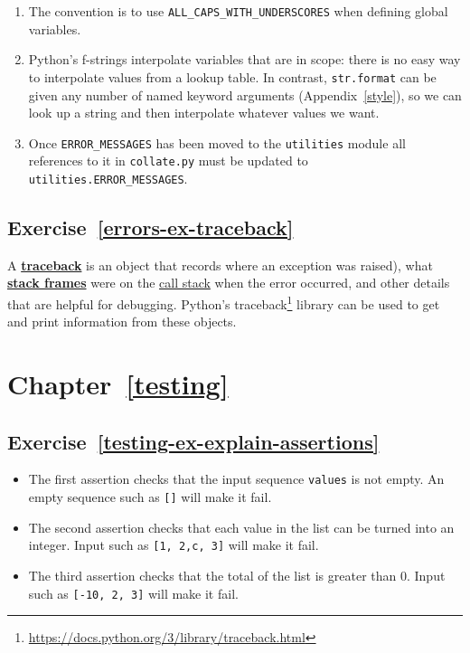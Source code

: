 \documentclass[
]{krantz}
\renewcommand{\href}[2]{#2\footnote{\url{#1}}}
\newcommand{\gref}[2]{\hyperlink{#2}{\textbf{#1}}}
\begin{document}
\begin{enumerate}
\def\labelenumi{\arabic{enumi}.}
\item
  The convention is to use \texttt{ALL\_CAPS\_WITH\_UNDERSCORES} when defining global variables.
\item
  Python's f-strings interpolate variables that are in scope:
  there is no easy way to interpolate values from a lookup table.
  In contrast,
  \texttt{str.format} can be given any number of named keyword arguments (Appendix~\ref{style}),
  so we can look up a string and then interpolate whatever values we want.
\item
  Once \texttt{ERROR\_MESSAGES} has been moved to the \texttt{utilities} module
  all references to it in \texttt{collate.py} must be updated to \texttt{utilities.ERROR\_MESSAGES}.
\end{enumerate}

\hypertarget{exercise-referrors-ex-traceback}{%
\subsection*{Exercise~\ref{errors-ex-traceback}}\label{exercise-referrors-ex-traceback}}


A \gref{traceback}{traceback} is an object that records where an exception was
raised), what \gref{stack frames}{stack\_frame} were on the
\protect\hyperlink{call_stack}{call stack} when the error occurred, and other details that are
helpful for debugging. Python's \href{https://docs.python.org/3/library/traceback.html}{traceback} library can be
used to get and print information from these objects.

\hypertarget{chapter-reftesting}{%
\section*{Chapter~\ref{testing}}\label{chapter-reftesting}}

\hypertarget{exercise-reftesting-ex-explain-assertions}{%
\subsection*{Exercise~\ref{testing-ex-explain-assertions}}\label{exercise-reftesting-ex-explain-assertions}}


\begin{itemize}
\item
  The first assertion checks that the input sequence \texttt{values} is not empty.
  An empty sequence such as \texttt{{[}{]}} will make it fail.
\item
  The second assertion checks that each value in the list can be turned into an integer.
  Input such as \texttt{{[}1,\ 2,\textquotesingle{}c\textquotesingle{},\ 3{]}} will make it fail.
\item
  The third assertion checks that the total of the list is greater than 0.
  Input such as \texttt{{[}-10,\ 2,\ 3{]}} will make it fail.
\end{itemize}
\end{document}

